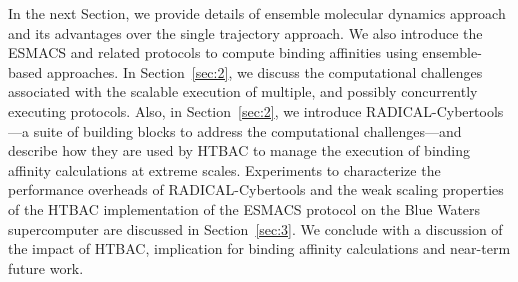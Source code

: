 

In the next Section, we provide details of ensemble molecular dynamics
approach and its advantages over the single trajectory approach. We also
introduce the ESMACS and related protocols to compute binding affinities
using ensemble-based approaches. In Section~\ref{sec:2}, we discuss the
computational challenges associated with the scalable execution of multiple,
and possibly concurrently executing protocols. Also, in Section~\ref{sec:2}, 
we introduce RADICAL-Cybertools---a suite of building blocks to address the 
computational challenges---and describe how they are used by HTBAC to
manage the execution of binding affinity calculations at extreme scales.
Experiments to characterize the performance overheads of RADICAL-Cybertools
and the weak scaling properties of the HTBAC implementation of the ESMACS
protocol on the Blue Waters supercomputer are discussed in
Section~\ref{sec:3}. 
We conclude with a discussion of the impact of HTBAC, implication for binding
affinity calculations and near-term future work.